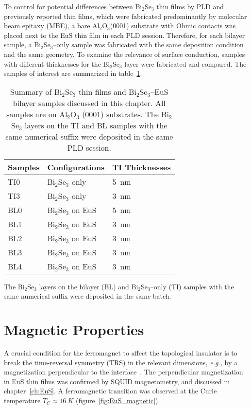 To control for potential differences between Bi$_2$Se$_3$ thin films by PLD and previously reported thin films, which were fabricated predominantly by molecular beam epitaxy (MBE), a bare Al$_2$O$_3$(0001) substrate with Ohmic contacts was placed next to the EuS thin film in each PLD session. Therefore, for each bilayer sample, a Bi$_2$Se$_3$--only sample was fabricated with the same deposition condition and the same geometry. To examine the relevance of surface conduction, samples with different thicknesses for the Bi$_2$Se$_3$ layer were fabricated and compared. The samples of interest are summarized in table~\ref{tab:bl2014_samples}.%
\begin{table}[ht]
    \centering
    \begin{tabularx}{0.6\columnwidth}[t]{l|l|X}
    \caption[Summary of Bi$_2$Se$_3$ thin films and Bi$_2$Se$_3$--EuS bilayer samples]{\label{tab:bl2014_samples}Summary of Bi$_2$Se$_3$ thin films and Bi$_2$Se$_3$--EuS bilayer samples discussed in this chapter. All samples are on Al$_2$O$_3$ (0001) substrates. The Bi$_2$Se$_3$ layers on the TI and BL samples with the same numerical suffix were deposited in the same PLD session.}\\
		\hline\hline
        Samples & Configurations & TI Thicknesses\\
        \hline
        TI0 & Bi$_2$Se$_3$ only & 5~nm\\
        TI3 & Bi$_2$Se$_3$ only & 3~nm\\
        BL0 & Bi$_2$Se$_3$ on EuS & 5~nm\\
        BL1 & Bi$_2$Se$_3$ on EuS & 3~nm\\
        BL2 & Bi$_2$Se$_3$ on EuS & 3~nm\\
        BL3 & Bi$_2$Se$_3$ on EuS & 3~nm\\
        BL4 & Bi$_2$Se$_3$ on EuS & 3~nm\\
		\hline\hline
    \end{tabularx}
\end{table} %
The Bi$_2$Se$_3$ layers on the bilayer (BL) and Bi$_2$Se$_3$--only (TI) samples with the same numerical suffix were deposited in the same batch.


\section{Magnetic Properties}\label{sec:bl2014_mag}
A crucial condition for the ferromagnet to affect the topological insulator is to break the time-reversal symmetry (TRS) in the relevant dimensions, \textit{e.g.,} by a magnetization perpendicular to the interface~\cite{TI_Col, QAH_TI_Yu, MnSe}. The perpendicular magnetization in EuS thin films was confirmed by SQUID magnetometry, and discussed in chapter~\ref{ch:EuS}. A ferromagnetic transition was observed at the Curie temperature $T_C \approx \SI{16}{K}$ (figure~\ref{fig:EuS_magnetic}).

